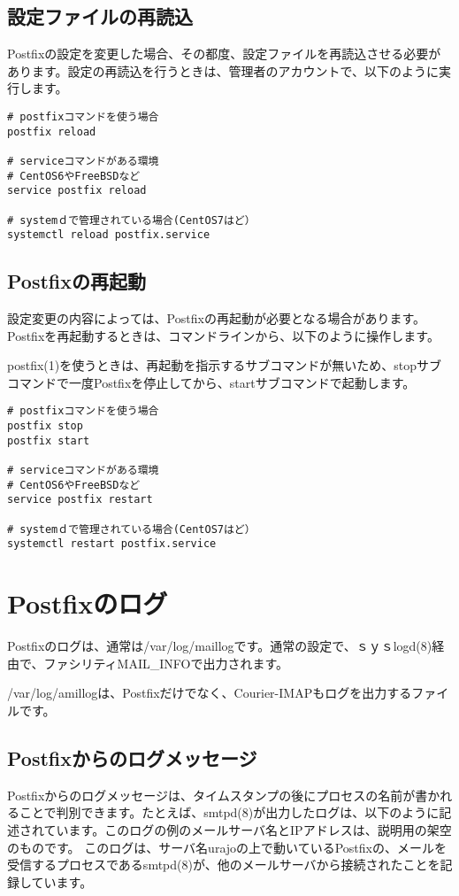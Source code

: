 \subsection{設定ファイルの再読込}
Postfixの設定を変更した場合、その都度、設定ファイルを再読込させる必要があります。設定の再読込を行うときは、管理者のアカウントで、以下のように実行します。

\begin{verbatim}
# postfixコマンドを使う場合
postfix reload

# serviceコマンドがある環境
# CentOS6やFreeBSDなど
service postfix reload

# systemｄで管理されている場合(CentOS7はど）
systemctl reload postfix.service
\end{verbatim}


\subsection{Postfixの再起動}
設定変更の内容によっては、Postfixの再起動が必要となる場合があります。Postfixを再起動するときは、コマンドラインから、以下のように操作します。

postfix(1)を使うときは、再起動を指示するサブコマンドが無いため、stopサブコマンドで一度Postfixを停止してから、startサブコマンドで起動します。

\begin{verbatim}
# postfixコマンドを使う場合
postfix stop
postfix start

# serviceコマンドがある環境
# CentOS6やFreeBSDなど
service postfix restart

# systemｄで管理されている場合(CentOS7はど）
systemctl restart postfix.service
\end{verbatim}


\section{Postfixのログ}
Postfixのログは、通常は/var/log/maillogです。通常の設定で、ｓｙｓlogd(8)経由で、ファシリティMAIL\_INFOで出力されます。

/var/log/amillogは、Postfixだけでなく、Courier-IMAPもログを出力するファイルです。

\subsection{Postfixからのログメッセージ}
Postfixからのログメッセージは、タイムスタンプの後にプロセスの名前が書かれることで判別できます。たとえば、smtpd(8)が出力したログは、以下のように記述されています。このログの例のメールサーバ名とIPアドレスは、説明用の架空のものです。
このログは、サーバ名urajoの上で動いているPostfixの、メールを受信するプロセスであるsmtpd(8)が、他のメールサーバから接続されたことを記録しています。

